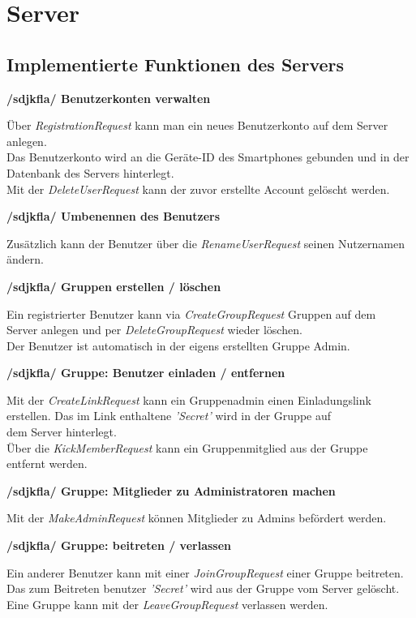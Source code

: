 \section{Server}


\subsection{Implementierte Funktionen des Servers}

\textbf{/sdjkfla/ Benutzerkonten verwalten}

Über \textit{RegistrationRequest} kann man ein neues Benutzerkonto auf dem Server anlegen.\\
Das Benutzerkonto wird an die Geräte-ID des Smartphones gebunden und in der\\
Datenbank des Servers hinterlegt.\\
Mit der \textit{DeleteUserRequest} kann der zuvor erstellte Account gelöscht werden.

\textbf{/sdjkfla/ Umbenennen des Benutzers}

Zusätzlich kann der Benutzer über die \textit{RenameUserRequest} seinen Nutzernamen ändern.

\textbf{/sdjkfla/ Gruppen erstellen / löschen}

Ein registrierter Benutzer kann via \textit{CreateGroupRequest} Gruppen auf dem\\
Server anlegen und per \textit{DeleteGroupRequest} wieder löschen.\\
Der Benutzer ist automatisch in der eigens erstellten Gruppe Admin.

\textbf{/sdjkfla/ Gruppe: Benutzer einladen / entfernen}

Mit der \textit{CreateLinkRequest} kann ein Gruppenadmin einen Einladungslink\\
erstellen. Das im Link enthaltene \textit{'Secret'} wird in der Gruppe auf\\
dem Server hinterlegt.\\
Über die \textit{KickMemberRequest} kann ein Gruppenmitglied aus der Gruppe\\
entfernt werden.

\textbf{/sdjkfla/ Gruppe: Mitglieder zu Administratoren machen}

Mit der \textit{MakeAdminRequest} können Mitglieder zu Admins befördert werden.

\textbf{/sdjkfla/ Gruppe: beitreten / verlassen}

Ein anderer Benutzer kann mit einer \textit{JoinGroupRequest} einer Gruppe beitreten.\\
Das zum Beitreten benutzer \textit{'Secret'} wird aus der Gruppe vom Server gelöscht.\\
Eine Gruppe kann mit der \textit{LeaveGroupRequest} verlassen werden.

